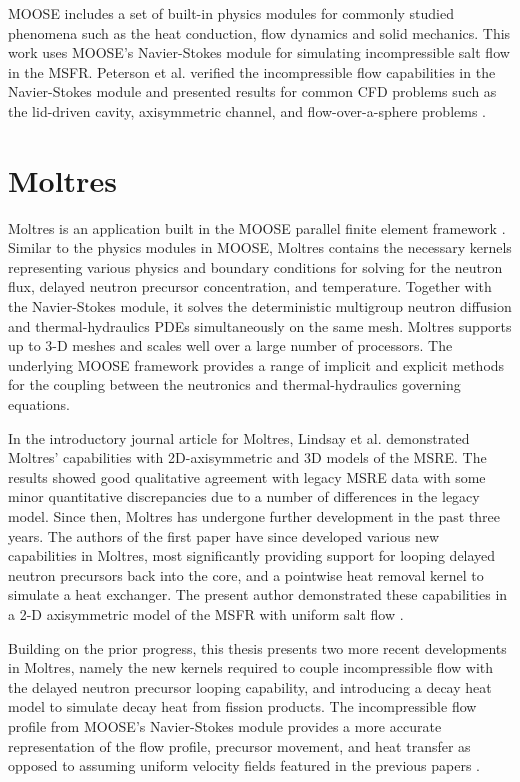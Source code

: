 \gls{MOOSE} includes a set of built-in physics modules for commonly studied
phenomena such as the heat conduction, flow dynamics and solid mechanics. This
work uses \gls{MOOSE}'s Navier-Stokes module for simulating
incompressible salt flow in the \gls{MSFR}. Peterson et al. verified the
incompressible flow capabilities in the
Navier-Stokes module and presented results for common \gls{CFD} problems such
as the lid-driven cavity, axisymmetric channel, and flow-over-a-sphere
problems \cite{peterson_overview_2017}. 

\section{Moltres}

Moltres is an application built in the \gls{MOOSE} parallel finite element
framework \cite{lindsay_introduction_2018}. Similar to the physics modules in
\gls{MOOSE}, Moltres contains the necessary kernels representing various
physics and boundary conditions for solving for the neutron flux, delayed
neutron precursor concentration, and temperature. Together with the
Navier-Stokes module, it solves
the deterministic multigroup neutron diffusion and thermal-hydraulics
\glspl{PDE} simultaneously on the same mesh. Moltres supports up to 3-D meshes
and scales well over a large number of processors. The underlying \gls{MOOSE}
framework provides a range of implicit and explicit methods for the coupling
between the neutronics and thermal-hydraulics governing equations.

In the introductory journal article for Moltres, Lindsay et al.
\cite{lindsay_introduction_2018} demonstrated Moltres' capabilities with
2D-axisymmetric and 3D models of the \gls{MSRE}. The results showed good
qualitative agreement with legacy \gls{MSRE} data with some minor
quantitative discrepancies due to a number of differences in the legacy model. 
Since then, Moltres has undergone further development in the past three years.
The authors of the first paper have since developed various new capabilities
in Moltres, most significantly providing support for looping delayed neutron
precursors back into the core, and a pointwise heat removal kernel to simulate
a heat exchanger. The present author demonstrated these capabilities in a
2-D axisymmetric model of the \gls{MSFR} with uniform salt flow
\cite{park_safety_2019}. 

Building on the prior progress, this thesis presents two more recent
developments in Moltres, namely the new kernels required to couple
incompressible flow with the delayed neutron precursor looping capability, and
introducing a decay heat model to simulate decay heat from fission products.
The incompressible flow profile from \gls{MOOSE}'s Navier-Stokes module
provides a more accurate representation of the flow profile, precursor
movement, and heat transfer as opposed to assuming uniform velocity fields
featured in the previous papers \cite{lindsay_introduction_2018,
park_safety_2019}.

